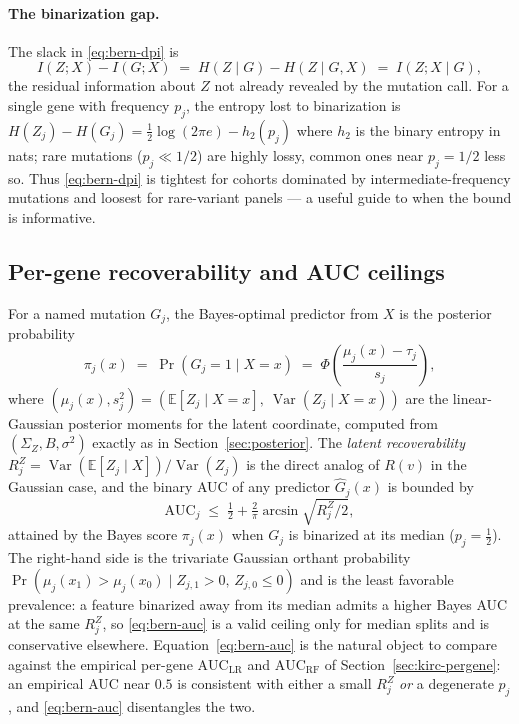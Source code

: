\documentclass{article}
\newcommand{\E}{\mathbb{E}}
\newcommand{\Var}{\operatorname{Var}}
\begin{document}
\paragraph{The binarization gap.}
The slack in \eqref{eq:bern-dpi} is
\[
  I(Z;X) - I(G;X) \;=\; H(Z\mid G) - H(Z\mid G,X) \;=\; I(Z;X \mid G),
\]
the residual information about $Z$ not already revealed by the mutation call.
For a single gene with frequency $p_j$, the entropy lost to binarization is
$H(Z_j) - H(G_j) = \tfrac12 \log(2\pi e) - h_2(p_j)$ where $h_2$ is the binary
entropy in nats; rare mutations ($p_j \ll 1/2$) are highly lossy, common ones
near $p_j = 1/2$ less so. Thus \eqref{eq:bern-dpi} is tightest for cohorts
dominated by intermediate-frequency mutations and loosest for rare-variant
panels --- a useful guide to when the bound is informative.

\subsection{Per-gene recoverability and AUC ceilings}
\label{sec:bern-pergene}

For a named mutation $G_j$, the Bayes-optimal predictor from $X$ is the
posterior probability
\[
  \pi_j(x) \;=\; \Pr(G_j = 1 \mid X = x) \;=\; \Phi\!\left(\frac{\mu_j(x) - \tau_j}{s_j}\right),
\]
where $(\mu_j(x), s_j^2) = (\E[Z_j \mid X=x],\ \Var(Z_j \mid X=x))$ are the
linear-Gaussian posterior moments for the latent coordinate, computed from
$(\Sigma_Z, B, \sigma^2)$ exactly as in Section~\ref{sec:posterior}. The
\emph{latent recoverability} $R_j^Z = \Var(\E[Z_j\mid X]) / \Var(Z_j)$ is the
direct analog of $R(v)$ in the Gaussian case, and the binary AUC of any
predictor $\hat G_j(x)$ is bounded by
\begin{equation}
  \mathrm{AUC}_j \;\le\; \tfrac12+\tfrac{2}{\pi}\arcsin\!\sqrt{R_j^Z/2},
  \label{eq:bern-auc}
\end{equation}
attained by the Bayes score $\pi_j(x)$ when $G_j$ is binarized at its median
($p_j=\tfrac12$). The right-hand side is the trivariate Gaussian orthant
probability $\Pr(\mu_j(x_1)>\mu_j(x_0)\mid Z_{j,1}>0,\,Z_{j,0}\le0)$ and is the
least favorable prevalence: a feature binarized away from its median admits a
higher Bayes AUC at the same $R_j^Z$, so \eqref{eq:bern-auc} is a valid ceiling
only for median splits and is conservative elsewhere. Equation~\eqref{eq:bern-auc}
is the natural object to compare against the empirical per-gene
$\mathrm{AUC}_{\mathrm{LR}}$ and $\mathrm{AUC}_{\mathrm{RF}}$ of
Section~\ref{sec:kirc-pergene}: an empirical AUC near $0.5$ is consistent with
either a small $R_j^Z$ \emph{or} a degenerate $p_j$, and \eqref{eq:bern-auc}
disentangles the two.
\end{document}
